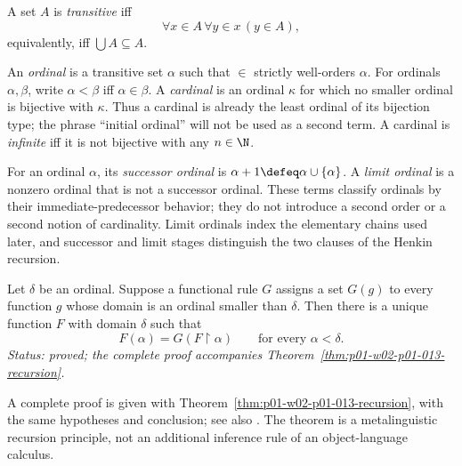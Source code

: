 \begin{definition}
\label{def:transitive-set}
A set \(A\) is \emph{transitive} iff
\[
  \forall x\in A\,\forall y\in x\,(y\in A),
\]
equivalently, iff \(\bigcup A\subseteq A\).
\end{definition}

\begin{definition}
\label{def:ordinal-cardinal}
An \emph{ordinal} is a transitive set \(\alpha\) such that \(\in\) strictly
well-orders \(\alpha\).  For ordinals \(\alpha,\beta\), write
\(\alpha<\beta\) iff \(\alpha\in\beta\).  A \emph{cardinal} is an ordinal
\(\kappa\) for which no smaller ordinal is bijective with \(\kappa\).  Thus a
cardinal is already the least ordinal of its bijection type; the phrase
``initial ordinal'' will not be used as a second term.  A cardinal is
\emph{infinite} iff it is not bijective with any \(n\in\N\).
\end{definition}

For an ordinal \(\alpha\), its \emph{successor ordinal} is
\(\alpha+1\defeq\alpha\cup\{\alpha\}\).  A \emph{limit ordinal} is a nonzero
ordinal that is not a successor ordinal.  These terms classify ordinals by
their immediate-predecessor behavior; they do not introduce a second order or
a second notion of cardinality.  Limit ordinals index the elementary chains
used later, and successor and limit stages distinguish the two clauses of the
Henkin recursion.

\begin{theorem}
\label{thm:transfinite-recursion}
Let \(\delta\) be an ordinal.  Suppose a functional rule \(G\) assigns a set
\(G(g)\) to every function \(g\) whose domain is an ordinal smaller than
\(\delta\).  Then there is a unique function \(F\) with domain \(\delta\) such
that
\[
 F(\alpha)=G(F\mathbin{\upharpoonright}\alpha)
 \qquad\text{for every }\alpha<\delta.
\]
\textit{Status: proved; the complete proof accompanies
Theorem~\ref{thm:p01-w02-p01-013-recursion}.}
\end{theorem}

A complete proof is given with
Theorem~\ref{thm:p01-w02-p01-013-recursion}, with the same hypotheses and
conclusion; see also \cite{Jech2003}. The theorem is a metalinguistic
recursion principle, not an additional inference rule of an
object-language calculus.


